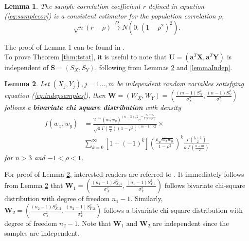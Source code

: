 \documentclass[12pt, a4paper]{article}
\newtheorem{lemma}{Lemma}
\begin{document}
	\begin{lemma}
		The sample correlation coefficient $r$ defined in equation (\ref{eq:samplecor}) is a consistent estimator for the population correlation $\rho$, 
		\[\sqrt{n}(r - \rho ) \stackrel{D}{\rightarrow}N\left(0, (1-\rho^2)^2\right).\]
	\end{lemma}
	The proof of Lemma 1 can be found in \citet{fisher1915frequency}. \\
	
	To prove Theorem \ref{thm:tstat}, it is useful to note that $\bm U = (\bm a^T\bm X, \bm a^T\bm Y)$ is independent of $\bm S = (S_X, S_Y)$,
	following from Lemmas \ref{lemmabiChisq} and \ref{lemmaIndep}.
	\begin{lemma}\label{lemmabiChisq}
		Let $(X_{j}, Y_{j}), j=1 \ldots,  m$ be independent random variables satisfying equation (\ref{eq:indepsamples}),
		then $\bm W = (W_{X},W_{Y}) =(\frac{(m -1)S_{X}^2}{\sigma_X^2}, \frac{(n-1)S_{Y}^2}{\sigma_Y^2})$ 
		follows a \textbf{bivariate chi square distribution} with density 
		\begin{equation}\label{biChisq}
			\begin{aligned}
				f(w_x, w_y) & = \frac{2^{-m}(w_xw_y)^{(n-3)/2}e^{-\frac{w_x +
							w_y}{2(1-\rho^2)}}}{\sqrt{\pi}\Gamma(\frac{m}{2})(1-\rho^2)^{(m-1)/2}} \times \\
				& \sum_{k=0}^{\infty}[1 +
				(-1)^k]\left(\frac{\rho\sqrt{w_xw_y}}{1-\rho^2}\right)^k\frac{\Gamma(\frac{k+1}{2})}{k!\Gamma(\frac{k+ m}{2})}
			\end{aligned}
		\end{equation}
		for $n>3$ and $-1<\rho < 1$.
	\end{lemma}
	For proof of Lemma \ref{lemmabiChisq}, interested readers are referred to \citet{joarder2009moments}.
	It immediately follows from Lemma \ref{lemmabiChisq} that $\bm W_1 = (\frac{(n_1 -1)S_{X, 1}^2}{\sigma_X^2}, \frac{(n_1-1)S_{Y, 1}^2}{\sigma_Y^2})$ follows bivariate chi-square distribution with degree of freedom $n_1-1$. Similarly, $\bm W_2 =(\frac{(n_2 -1)S_{X, 2}^2}{\sigma_X^2}, \frac{(n_2-1)S_{Y, 2}^2}{\sigma_Y^2})$ follows a bivariate chi-square distribution with degree of freedom $n_2-1$.  Note that $\bm W_1$ and $\bm W_2$ are independent since the samples are independent. 
	
\end{document}

